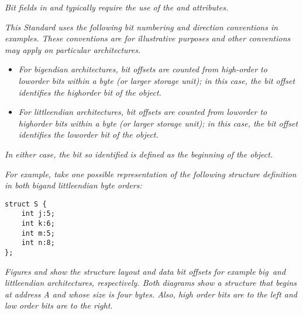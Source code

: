 \textit{Bit fields in  and  
typically 
require the use 
of 
the
\DWATdatabitoffset{} and 
\DWATbitsize{} attributes.}

\textit{This Standard uses the following bit numbering and direction
conventions in examples. These conventions are for illustrative
purposes and other conventions may apply on particular
architectures.}
\begin{itemize}
\item \textit{For big\dash endian architectures, bit offsets are
counted from high-order to low\dash order bits within a byte (or
larger storage unit); in this case, the bit offset identifies
the high\dash order bit of the object.}

\item \textit{For little\dash endian architectures, bit offsets are
counted from low\dash order to high\dash order bits within a byte (or
larger storage unit); in this case, the bit offset identifies
the low\dash order bit of the object.}
\end{itemize}


\textit{In either case, the bit so identified is defined as the 
beginning of the object.}

\textit{For example, take one possible representation of the following 
 structure definition 
in both big\dash and little\dash endian byte orders:}

\begin{lstlisting}
struct S {
    int j:5;
    int k:6;
    int m:5;
    int n:8;
};
\end{lstlisting}

\textit{Figures  and
show the structure layout
and data bit offsets for example big\dash\   and little\dash endian
architectures, respectively. Both diagrams show a structure
that begins at address A and whose size is four bytes. Also,
high order bits are to the left and low order bits are to
the right.}

